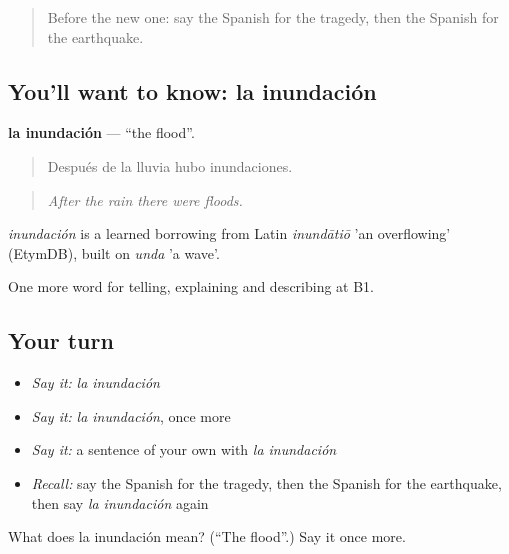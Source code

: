 \label{lesson:ES-C528-inundacion}



\begin{quote}
Before the new one: say the Spanish for the tragedy, then the Spanish for the earthquake.
\end{quote}

\subsection*{You'll want to know: la inundación}
\textbf{la inundación} — \textquotedblleft{}the flood\textquotedblright{}.

\begin{quote}
Después de la lluvia hubo inundaciones.
\end{quote}

\begin{quote}
\emph{After the rain there were floods.}
\end{quote}

\begin{cousinweb}
\emph{inundación} is a learned borrowing from Latin \emph{inundātiō} 'an overflowing' (EtymDB), built on \emph{unda} 'a wave'.
\end{cousinweb}

\begin{grammarlens}[title={What you've built}]
One more word for telling, explaining and describing at B1.
\end{grammarlens}

\subsection*{Your turn}
\begin{itemize}
\raggedright
  \item \emph{Say it:} \emph{la inundación}
  \item \emph{Say it:} \emph{la inundación}, once more
  \item \emph{Say it:} a sentence of your own with \emph{la inundación}
  \item \emph{Recall:} say the Spanish for the tragedy, then the Spanish for the earthquake, then say \emph{la inundación} again
\end{itemize}

\begin{tcolorbox}[breakable,colback=teal!4,colframe=teal!35!black,title={Before you move on}]
What does la inundación mean? (\textquotedblleft{}The flood\textquotedblright{}.) Say it once more.
\end{tcolorbox}
